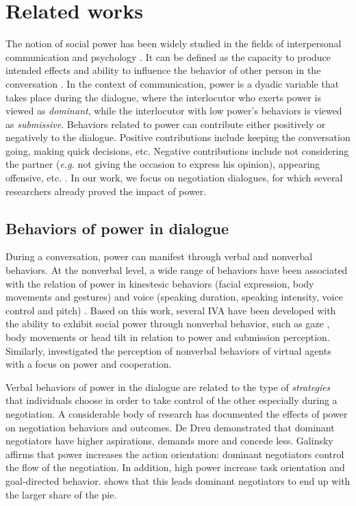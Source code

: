 \documentclass{llncs}
\begin{document}
	\section{Related works}
	The notion of social power has been widely studied in the fields of interpersonal communication and psychology \cite{kecskes2013research}. It can be defined as the capacity to produce intended effects and ability to influence the behavior of other person in the conversation \cite{dunbar2005perceptions}. In the context of communication, power is a dyadic variable that takes place during the dialogue, where the interlocutor who exerts power is viewed as \textit{dominant}, while the interlocutor with low power's behaviors is viewed as \textit{submissive}. 
	Behaviors related to power can contribute either positively or negatively to the dialogue. Positive contributions include keeping the conversation going, making quick decisions, etc. Negative contributions include not considering the partner (\emph{e.g.} not giving the occasion to express his opinion), appearing offensive, etc. \cite{zablotskaya2012relating}. In our work, we focus on negotiation dialogues, for which several researchers already proved the impact of power\cite{van2006power}.
		\vspace{-1em} 
	\subsection*{Behaviors of power in dialogue}
	\label{domDialogue}
	During a conversation, power can manifest through verbal and nonverbal behaviors.	
	At the nonverbal level, a wide range of behaviors have been associated with the relation of power in kinestesic behaviors (facial expression, body movements and gestures) and voice (speaking duration, speaking intensity, voice control and pitch) \cite{burgoonnonverbal}. Based on this work, several IVA have been developed with the ability to exhibit social power through nonverbal behavior, such as gaze \cite{lance2008relation}, body movements \cite{mignault2003many} or head tilt \cite{gebhard2014exploring,callejas2014computational} in relation to power and submission perception. Similarly, \cite{strassmann2016effect} investigated the perception of nonverbal behaviors of virtual agents with a focus on power and cooperation.
	
	Verbal behaviors of power in the dialogue are related to the type of \textit{strategies} that individuals choose in order to take control of the other especially during a negotiation. A considerable body of research has documented the effects of power on negotiation behaviors and outcomes. De Dreu demonstrated that \cite{de1995impact} dominant negotiators have higher aspirations, demands more and concede less. Galinsky \cite{galinsky2003power} affirms that power increases the action orientation: dominant negotiators control the flow of the negotiation. In addition, high power increase task orientation and goal-directed behavior. \cite{giebels2000interdependence} shows that this leads dominant negotiators to end up with the larger share of the pie.
	
\end{document}
